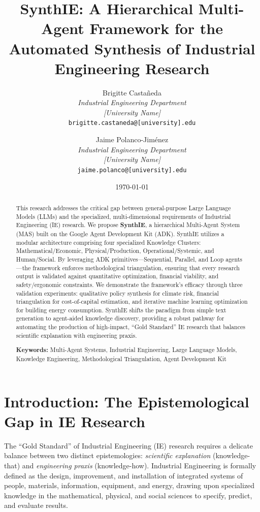 \documentclass[12pt,a4paper]{article}
\title{\textbf{SynthIE: A Hierarchical Multi-Agent Framework for the Automated Synthesis of Industrial Engineering Research}}
\author{
    Brigitte Castañeda \\
    \textit{Industrial Engineering Department} \\
    \textit{[University Name]} \\
    \texttt{brigitte.castaneda@[university].edu}
    \and
    Jaime Polanco-Jiménez \\
    \textit{Industrial Engineering Department} \\
    \textit{[University Name]} \\
    \texttt{jaime.polanco@[university].edu}
}
\date{\today}
\begin{document}
\maketitle

\begin{abstract}
This research addresses the critical gap between general-purpose Large Language Models (LLMs) and the specialized, multi-dimensional requirements of Industrial Engineering (IE) research. We propose \textbf{SynthIE}, a hierarchical Multi-Agent System (MAS) built on the Google Agent Development Kit (ADK). SynthIE utilizes a modular architecture comprising four specialized Knowledge Clusters: Mathematical/Economic, Physical/Production, Operational/Systemic, and Human/Social. By leveraging ADK primitives—Sequential, Parallel, and Loop agents—the framework enforces methodological triangulation, ensuring that every research output is validated against quantitative optimization, financial viability, and safety/ergonomic constraints. We demonstrate the framework's efficacy through three validation experiments: qualitative policy synthesis for climate risk, financial triangulation for cost-of-capital estimation, and iterative machine learning optimization for building energy consumption. SynthIE shifts the paradigm from simple text generation to agent-aided knowledge discovery, providing a robust pathway for automating the production of high-impact, ``Gold Standard'' IE research that balances scientific explanation with engineering praxis.

\textbf{Keywords:} Multi-Agent Systems, Industrial Engineering, Large Language Models, Knowledge Engineering, Methodological Triangulation, Agent Development Kit
\end{abstract}

\section{Introduction: The Epistemological Gap in IE Research}

The ``Gold Standard'' of Industrial Engineering (IE) research requires a delicate balance between two distinct epistemologies: \textit{scientific explanation} (knowledge-that) and \textit{engineering praxis} (knowledge-how). Industrial Engineering is formally defined as the design, improvement, and installation of integrated systems of people, materials, information, equipment, and energy, drawing upon specialized knowledge in the mathematical, physical, and social sciences to specify, predict, and evaluate results.
\end{document}
